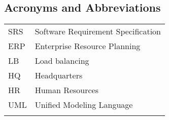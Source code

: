\begin{center}
\section*{Acronyms and Abbreviations}
\end{center}


\begin{tabular}{p{3cm}p{11cm}}
SRS & Software Requirement Specification \\
ERP & Enterprise Resource Planning \\
LB & Load balancing \\
HQ & Headquarters \\
HR & Human Resources \\
UML & Unified Modeling Language \\
\\
\end{tabular}
